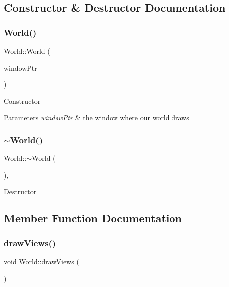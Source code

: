 \subsection{Constructor \& Destructor Documentation}
\mbox{\label{classWorld_a96ca734b18df2cf85e666fc6d358e12c}} 
\subsubsection{\texorpdfstring{World()}{World()}}
{\footnotesize\ttfamily World\+::\+World (\begin{DoxyParamCaption}\item[{std\+::shared\+\_\+ptr$<$ sf\+::\+Render\+Window $>$}]{window\+Ptr }\end{DoxyParamCaption})\hspace{0.3cm}{\ttfamily [explicit]}}

Constructor 
\begin{DoxyParams}{Parameters}
{\em window\+Ptr} & the window where our world draws \\
\hline
\end{DoxyParams}
\mbox{\label{classWorld_adf5e8724afb4d083e566ee4e48905bf2}} 
\subsubsection{\texorpdfstring{$\sim$\+World()}{~World()}}
{\footnotesize\ttfamily World\+::$\sim$\+World (\begin{DoxyParamCaption}{ }\end{DoxyParamCaption})\hspace{0.3cm}{\ttfamily [override]}, {\ttfamily [default]}}

Destructor 

\subsection{Member Function Documentation}
\mbox{\label{classWorld_a8e8ad60668f8fe975f03bcb612264bc4}} 
\subsubsection{\texorpdfstring{draw\+Views()}{drawViews()}}
{\footnotesize\ttfamily void World\+::draw\+Views (\begin{DoxyParamCaption}{ }\end{DoxyParamCaption})}

